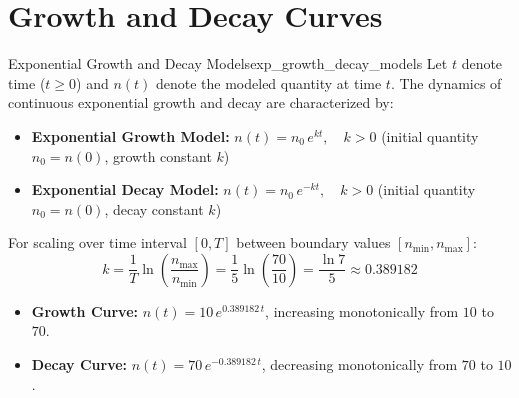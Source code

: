 \newpage

\section{Growth and Decay Curves}

\begin{definition}{Exponential Growth and Decay Models}{exp_growth_decay_models}
Let $t$ denote time ($t \ge 0$) and $n(t)$ denote the modeled quantity at time $t$. The dynamics of continuous exponential growth and decay are characterized by:
\begin{itemize}[noitemsep, leftmargin=*]
    \item \textbf{Exponential Growth Model:} $n(t) = n_0 \, e^{k t}, \quad k > 0$ \quad (initial quantity $n_0 = n(0)$, growth constant $k$)
    \item \textbf{Exponential Decay Model:} $n(t) = n_0 \, e^{-k t}, \quad k > 0$ \quad (initial quantity $n_0 = n(0)$, decay constant $k$)
\end{itemize}
For scaling over time interval $[0, T]$ between boundary values $[n_{\min}, n_{\max}]$:
\begin{equation}
    k = \frac{1}{T} \ln\left(\frac{n_{\max}}{n_{\min}}\right) = \frac{1}{5} \ln\left(\frac{70}{10}\right) = \frac{\ln 7}{5} \approx 0.389182
\end{equation}
\begin{itemize}[noitemsep]
    \item \textbf{Growth Curve:} $n(t) = 10 \, e^{0.389182 \, t}$, increasing monotonically from $10$ to $70$.
    \item \textbf{Decay Curve:} $n(t) = 70 \, e^{-0.389182 \, t}$, decreasing monotonically from $70$ to $10$.
\end{itemize}
\end{definition}

